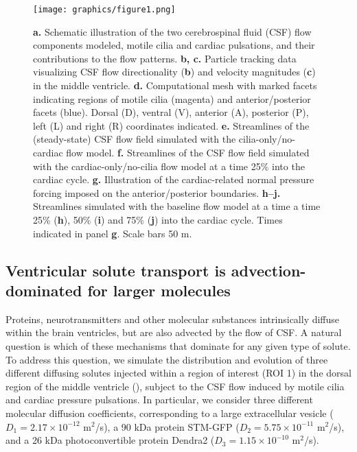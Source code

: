 \documentclass{WileyMSP-template}
\begin{document}
\begin{figure}
    \centering
    \texttt{[image: graphics/figure1.png]}
    \caption{
    \textbf{a.} Schematic illustration of the two cerebrospinal fluid (CSF) flow components modeled,
    motile cilia and cardiac pulsations, and their contributions to the flow patterns.
    \textbf{b, c.} Particle tracking data visualizing CSF flow directionality (\textbf{b}) and
    velocity magnitudes (\textbf{c}) in the middle ventricle.
    \textbf{d.} Computational mesh with marked facets indicating regions of motile cilia (magenta) and
    anterior/posterior facets (blue). Dorsal (D), ventral (V), anterior (A), posterior (P),
    left (L) and right (R) coordinates indicated.
    \textbf{e.} Streamlines of the (steady-state) CSF flow field simulated with the
    cilia-only/no-cardiac flow model.
    \textbf{f.} Streamlines of the CSF flow field simulated with the cardiac-only/no-cilia flow
    model at a time 25\% into the cardiac cycle. %
    \textbf{g.} Illustration of the cardiac-related normal pressure forcing imposed on the
    anterior/posterior boundaries.
    \textbf{h--j.} Streamlines simulated with the baseline flow model at
    a time a time 25\% (\textbf{h}), 50\% (\textbf{i}) and 75\% (\textbf{j})
    into the cardiac cycle. Times indicated in panel \textbf{g}.
    Scale bars 50 \textmu m.
    }
    \label{fig:fig1}
\end{figure}

\subsection{Ventricular solute transport is advection-dominated for larger molecules}

Proteins, neurotransmitters and other molecular substances
intrinsically diffuse within the brain ventricles, but are also
advected by the flow of CSF. A natural question is which of these
mechanisms that dominate for any given type of solute. To address this
question, we simulate the distribution and evolution of three
different diffusing solutes injected within a region of interest (ROI 1) in the
dorsal region of the middle ventricle (),
subject to the CSF flow induced by motile cilia and cardiac pressure
pulsations. In particular, we consider three different molecular
diffusion coefficients, corresponding to a large extracellular vesicle ($D_1 = 2.17
\times 10^{-12}$ m$^2$/s), a 90 kDa protein STM-GFP ($D_2 = 5.75
\times 10^{-11}$ m$^2$/s), and a 26 kDa photoconvertible protein
Dendra2 ($D_3 = 1.15 \times 10^{-10}$ m$^2$/s).
\end{document}
